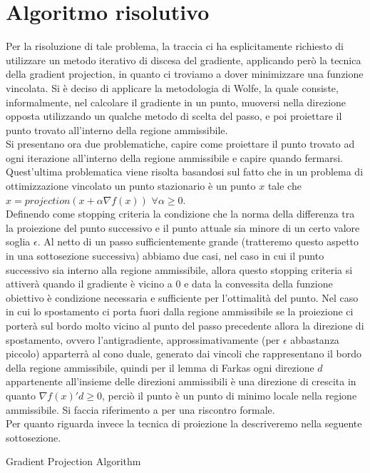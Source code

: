 \documentclass{article}
\begin{document}
\section{Algoritmo risolutivo}
Per la risoluzione di tale problema, la traccia ci ha esplicitamente richiesto di utilizzare un metodo iterativo di discesa del gradiente, applicando però la tecnica della gradient projection, in quanto ci troviamo a dover minimizzare una funzione vincolata. Si è deciso di applicare la metodologia di Wolfe, la quale consiste, informalmente, nel calcolare il gradiente in un punto, muoversi nella direzione opposta utilizzando un qualche metodo di scelta del passo, e poi proiettare il punto trovato all'interno della regione ammissibile.\\
Si presentano ora due problematiche, capire come proiettare il punto trovato ad ogni iterazione all'interno della regione ammissibile e capire quando fermarsi.
Quest'ultima problematica viene risolta basandosi sul fatto che in un problema di ottimizzazione vincolato un punto stazionario è un punto $x$ tale che $x = projection(x + \alpha\nabla f(x))$ $\forall \alpha \geq 0$.\\
Definendo come stopping criteria la condizione che la norma della differenza tra la proiezione del punto successivo e il punto attuale sia minore di un certo valore soglia $\epsilon$. Al netto di un passo sufficientemente grande (tratteremo questo aspetto in una sottosezione successiva) abbiamo due casi, nel caso in cui il punto successivo sia interno alla regione ammissibile, allora questo stopping criteria si attiverà quando il gradiente è vicino a 0 e data la convessita della funzione obiettivo è condizione necessaria e sufficiente per l'ottimalità del punto. Nel caso in cui lo spostamento ci porta fuori dalla regione ammissibile se la proiezione ci porterà sul bordo molto vicino al punto del passo precedente allora la direzione di spostamento, ovvero l'antigradiente, approssimativamente (per $\epsilon$ abbastanza piccolo) apparterrà al cono duale, generato dai vincoli che rappresentano il bordo della regione ammissibile, quindi per il lemma di Farkas ogni direzione $d$ appartenente all'insieme delle direzioni ammissibili è una direzione di crescita in quanto $\nabla f(x)'d \geq 0$, perciò il punto è un punto di minimo locale nella regione ammissibile. Si faccia riferimento a \cite{pgm_method} per una riscontro formale.\\
Per quanto riguarda invece la tecnica di proiezione la descriveremo nella seguente sottosezione.
\begin{algorithm}
\caption{Gradient Projection Algorithm}
\end{algorithm}
\end{document}
